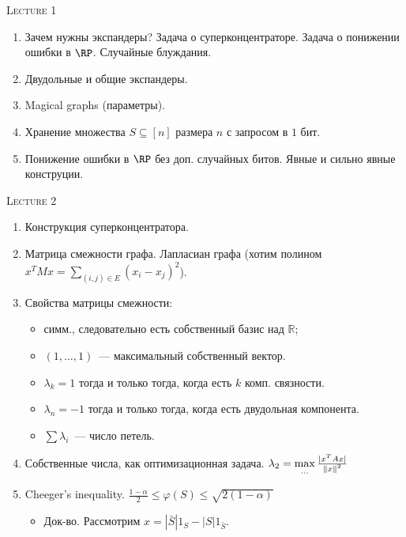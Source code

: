 \centerline{\textsc{Lecture 1}}

\begin{enumerate}
    \item Зачем нужны экспандеры? Задача о суперконцентраторе. Задача о понижении ошибки в
        $\RP$. Случайные блуждания.
    \item Двудольные и общие экспандеры.
    \item Magical graphs (параметры).
    \item Хранение множества $S \subseteq [n]$ размера $n$ с запросом в $1$ бит.
    \item Понижение ошибки в $\RP$ без доп. случайных битов. Явные и сильно явные конструции.
\end{enumerate}


\centerline{\textsc{Lecture 2}}

\begin{enumerate}
    \item Конструкция суперконцентратора.
    \item Матрица смежности графа. Лапласиан графа (хотим полином $x^T M x = \sum\limits_{(i, j) \in E} (x_i - x_j)^2$).
    \item Свойства матрицы смежности:
        \begin{itemize}
            \item симм., следовательно есть собственный базис над $\mathbb{R}$;
            \item $(1, \dots, 1)$~--- максимальный собственный вектор.
            \item $\lambda_k = 1$ тогда и только тогда, когда есть $k$ комп. связности.
            \item $\lambda_n = -1$ тогда и только тогда, когда есть двудольная компонента.
            \item $\sum \lambda_i$~--- число петель.
        \end{itemize}
    \item Собственные числа, как оптимизационная задача. $\lambda_2 = \max\limits_{...} \frac{|x^T A x|}{\left\lVert x\right\rVert^2}$
    \item Cheeger's inequality. $\frac{1 - \alpha}{2} \le \varphi(S) \le \sqrt{2 (1 - \alpha)}$
        \begin{itemize}
            \item Док-во. Рассмотрим $x = |\bar{S}| 1_S - |S| 1_{\bar{S}}$.
        \end{itemize}
\end{enumerate}

